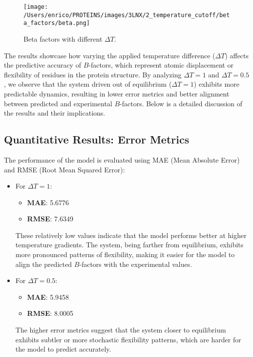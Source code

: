 \documentclass[English, Lau, oneside]{sapthesis}
\begin{document}
\begin{figure}[h!]
    \centering
    \texttt{[image: /Users/enrico/PROTEINS/images/3LNX/2\_temperature\_cutoff/beta\_factors/beta.png]}
    \caption{Beta factors with different $\Delta T$.}
\end{figure}


The results showcase how varying the applied temperature difference (\(\Delta T\)) affects the predictive accuracy of \( B \)-factors, which represent atomic displacement or flexibility of residues in the protein structure. By analyzing \(\Delta T = 1\) and \(\Delta T = 0.5\), we observe that the system driven out of equilibrium (\(\Delta T = 1\)) exhibits more predictable dynamics, resulting in lower error metrics and better alignment between predicted and experimental \( B \)-factors. Below is a detailed discussion of the results and their implications.

\subsection{Quantitative Results: Error Metrics}
The performance of the model is evaluated using MAE (Mean Absolute Error) and RMSE (Root Mean Squared Error):
\begin{itemize}
    \item For \(\Delta T = 1\):
    \begin{itemize}
        \item \textbf{MAE}: 5.6776
        \item \textbf{RMSE}: 7.6349
    \end{itemize}
    These relatively low values indicate that the model performs better at higher temperature gradients. The system, being farther from equilibrium, exhibits more pronounced patterns of flexibility, making it easier for the model to align the predicted \( B \)-factors with the experimental values.
    \item For \(\Delta T = 0.5\):
    \begin{itemize}
        \item \textbf{MAE}: 5.9458
        \item \textbf{RMSE}: 8.0005
    \end{itemize}
    The higher error metrics suggest that the system closer to equilibrium exhibits subtler or more stochastic flexibility patterns, which are harder for the model to predict accurately.
\end{itemize}
\end{document}
